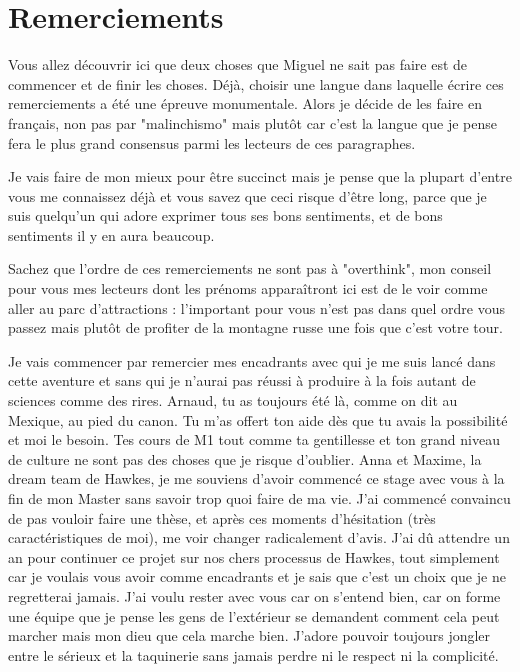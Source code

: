 \chapter{Remerciements}

Vous allez découvrir ici que deux choses que Miguel ne sait pas faire est de 
commencer et de finir les choses. Déjà, choisir une langue dans laquelle écrire ces 
remerciements a été une épreuve monumentale. Alors je décide de les faire en français,
non pas par "malinchismo" mais plutôt car c'est la langue que je pense fera le plus
grand consensus parmi les lecteurs de ces paragraphes.

Je vais faire de mon mieux pour être succinct mais je pense que la plupart d'entre
vous me connaissez déjà et vous savez que ceci risque d'être long, parce que je suis 
quelqu'un qui adore exprimer tous ses bons sentiments, et de bons sentiments il 
y en aura beaucoup. 

Sachez que l'ordre de ces remerciements ne sont pas à "overthink", mon conseil pour
vous mes lecteurs dont les prénoms apparaîtront ici est de le voir comme aller 
au parc d'attractions : l'important pour vous n'est pas dans quel ordre vous passez 
mais plutôt de profiter de la montagne russe une fois que c'est votre tour.

\vspace{1cm}

Je vais commencer par remercier mes encadrants avec qui je me suis lancé dans cette 
aventure et sans qui je n'aurai pas réussi à produire à la fois autant de sciences 
comme des rires. Arnaud, tu as toujours été là, comme on dit au Mexique, au pied du 
canon. Tu m'as offert ton aide dès que tu avais la possibilité et moi le besoin. 
Tes cours de M1 tout comme ta gentillesse et ton grand niveau de culture ne sont pas 
des choses que je risque d'oublier. 
Anna et Maxime, la dream team de Hawkes, je me souviens d'avoir commencé ce stage 
avec vous à la fin de mon Master sans savoir trop quoi faire de ma vie. J'ai commencé 
convaincu de pas vouloir faire une thèse, et après ces moments d'hésitation 
(très caractéristiques de moi), me voir changer radicalement d'avis. J'ai dû attendre 
un an pour continuer ce projet sur nos chers processus de Hawkes, tout simplement 
car je voulais vous avoir comme encadrants et je sais que c'est un choix que je ne 
regretterai jamais. J'ai voulu rester avec vous car on s'entend bien, car on forme 
une équipe que je pense les gens de l'extérieur se demandent comment cela peut marcher 
mais mon dieu que cela marche bien. J'adore pouvoir toujours jongler entre le sérieux 
et la taquinerie sans jamais perdre ni le respect ni la complicité. 


